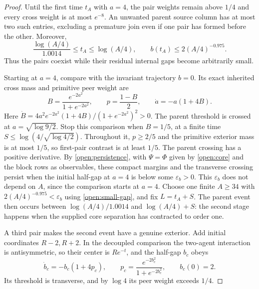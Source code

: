 \begin{proof}
Until the first time $t_A$ with $a=4$, the pair weights remain above $1/4$ and every cross weight is at most $e^{-8}$. An unwanted parent source column has at most two such entries, excluding a premature join even if one pair has formed before the other. Moreover,
\begin{equation}
\frac{\log(A/4)}{1.0014}\le t_A\le\log(A/4),
\qquad b(t_A)\le2(A/4)^{-0.975}.
\label{open:small-gap}
\end{equation}
Thus the pairs coexist while their residual internal gaps become arbitrarily small.

Starting at $a=4$, compare with the invariant trajectory $b=0$. Its exact inherited cross mass and primitive peer weight are
\begin{equation}
B=\frac{e^{-2a^2}}{1+e^{-2a^2}},\qquad
p=\frac{1-B}{2},\qquad
\dot a=-a(1+4B).
\end{equation}
Here $\dot B=4a^2e^{-2a^2}(1+4B)/(1+e^{-2a^2})^2>0$. The parent threshold is crossed at $a=\sqrt{\log9/2}$. Stop this comparison when $B=1/5$, at a finite time $S\le\log(4/\sqrt{\log4/2})$. Throughout it, $p\ge2/5$ and the primitive exterior mass is at most $1/5$, so first-pair contrast is at least $1/5$. The parent crossing has a positive derivative. By \cref{open:persistence}, with $\Psi=\Phi$ given by \cref{open:core} and the block rows as observables, these compact margins and the transverse crossing persist when the initial half-gap at $a=4$ is below some $\varepsilon_b>0$. This $\varepsilon_b$ does not depend on $A$, since the comparison starts at $a=4$. Choose one finite $A\ge34$ with $2(A/4)^{-0.975}<\varepsilon_b$ using \cref{open:small-gap}, and fix $L=t_A+S$. The parent event then occurs between $\log(A/4)/1.0014$ and $\log(A/4)+S$: the second stage happens when the supplied core separation has contracted to order one.

A third pair makes the second event have a genuine exterior. Add initial coordinates $R-2,R+2$. In the decoupled comparison the two-agent interaction is antisymmetric, so their center is $Re^{-t}$, and the half-gap $b_c$ obeys
\begin{equation}
\dot b_c=-b_c(1+4p_c),\qquad
p_c=\frac{e^{-2b_c^2}}{1+e^{-2b_c^2}},\qquad b_c(0)=2.
\end{equation}
Its threshold is transverse, and by $\log4$ its peer weight exceeds $1/4$.


\end{proof}
